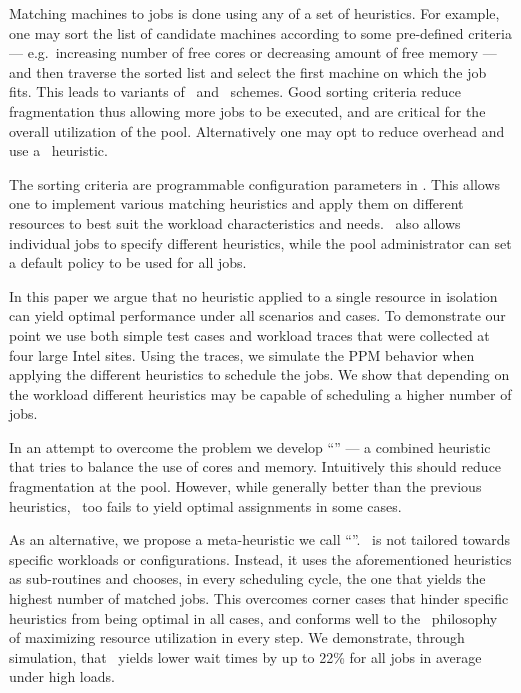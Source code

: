 Matching machines to jobs is done using any of a set of heuristics.
For example, one may sort the list of candidate machines according to
some pre-defined criteria --- e.g.\ increasing number of free cores or
decreasing amount of free memory --- and then traverse the sorted list
and select the first machine on which the job fits.
This leads to variants of \bef\ and \wof\ schemes.
Good sorting criteria reduce fragmentation thus allowing more jobs to be
executed, and are critical for the overall utilization of the pool.
Alternatively one may opt to reduce overhead and use a
\fif\ heuristic.

The sorting criteria are programmable configuration parameters in \nb.
This allows one to implement various matching heuristics and apply
them on different resources to best suit the workload characteristics
and needs.
\nb\ also allows individual jobs to specify different heuristics,
while the pool administrator can set a default policy to be used for
all jobs.

In this paper we argue that no heuristic applied to a
single resource in isolation can yield optimal performance under all
scenarios and cases.
To demonstrate our point we use both simple test cases and workload
traces that were collected at four large Intel sites.
Using the traces, we simulate the PPM behavior when applying the
different heuristics to schedule the jobs.
We show that depending on the workload different heuristics may be
capable of scheduling a higher number of jobs.

In an attempt to overcome the problem we develop ``\mif'' --- a
combined heuristic that tries to balance the use of cores and memory.
Intuitively this should reduce fragmentation at the pool.
However, while generally better than the previous heuristics,
\mif\ too fails to yield optimal assignments in some cases.

As an alternative, we propose a meta-heuristic we call ``\maj''.
\maj\ is not tailored towards specific workloads or configurations.
Instead, it uses the aforementioned heuristics as sub-routines and
chooses, in every scheduling cycle, the one that yields the highest
number of matched jobs.
This overcomes corner cases that hinder specific heuristics from being
optimal in all cases, and conforms well to the \nb\ philosophy of
maximizing resource utilization in every step.
We demonstrate, through simulation, that \maj\ yields lower wait times
by up to 22\% for all jobs in average under high loads.

